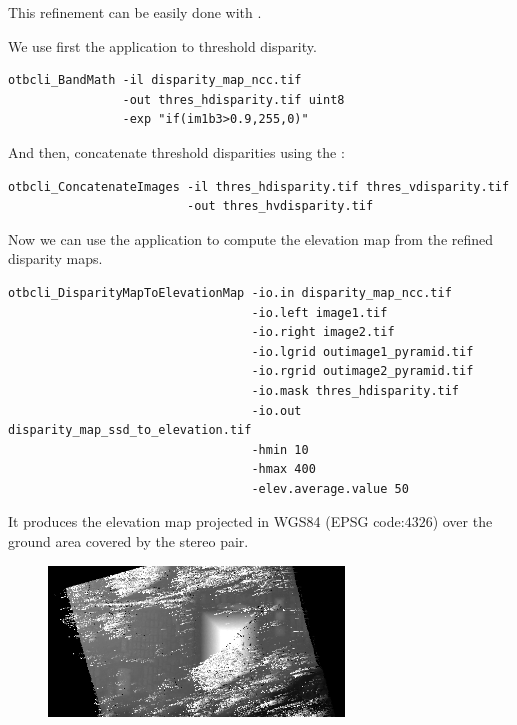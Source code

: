 This refinement can be easily done with \app.

We use first the  application to threshold disparity.

\begin{verbatim}
otbcli_BandMath -il disparity_map_ncc.tif
                -out thres_hdisparity.tif uint8
                -exp "if(im1b3>0.9,255,0)"
\end{verbatim}

And then, concatenate threshold disparities using the :

\begin{verbatim}
otbcli_ConcatenateImages -il thres_hdisparity.tif thres_vdisparity.tif
                         -out thres_hvdisparity.tif
\end{verbatim}

Now we can use the  application to
compute the elevation map from the refined disparity maps.

\begin{verbatim}
otbcli_DisparityMapToElevationMap -io.in disparity_map_ncc.tif
                                  -io.left image1.tif
                                  -io.right image2.tif
                                  -io.lgrid outimage1_pyramid.tif
                                  -io.rgrid outimage2_pyramid.tif
                                  -io.mask thres_hdisparity.tif
                                  -io.out disparity_map_ssd_to_elevation.tif
                                  -hmin 10
                                  -hmax 400
                                  -elev.average.value 50
\end{verbatim}

It produces the elevation map projected in WGS84 (EPSG code:$4326$) over the
ground area covered by the stereo pair.

\begin{figure}[!h]
  \center
  \includegraphics[width=0.7\textwidth]{../Art/MonteverdiImages/stereo_dem_zoom.png}
  \label{fig:MeanShiftVectorImageFilter}
\end{figure}
